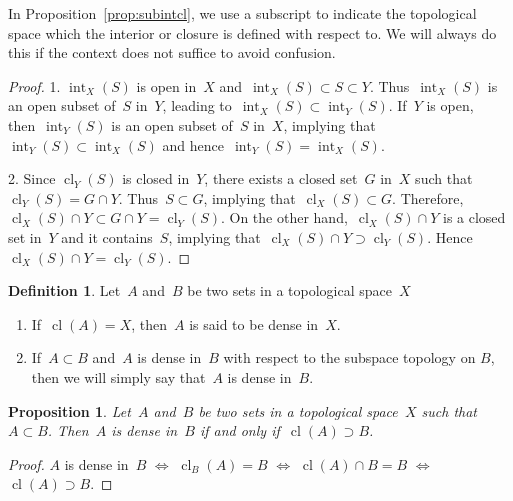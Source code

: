 \documentclass[11pt,a4paper]{article}  %
\newtheorem{proposition}{Proposition}[section]
\theoremstyle{definition}
\newtheorem{definition}{Definition}[section]
\DeclareMathOperator{\inter}{int}
\DeclareMathOperator{\cl}{cl}
\numberwithin{equation}{section}
\begin{document}
In Proposition~\ref{prop:subintcl}, we use a subscript to indicate the topological space which the
interior or closure is defined with respect to. We will always do this if the context does not
suffice to avoid confusion.

\begin{proof}
  1. $\inter_X(S)$ is open in~$X$ and~$\inter_X(S)\subset S\subset Y$. Thus~$\inter_X(S)$ is an open
     subset of~$S$ in~$Y$, leading to~$\inter_X(S)\subset \inter_Y(S)$. If~$Y$ is open,
     then~$\inter_Y(S)$ is an open subset of~$S$ in~$X$, implying that~$\inter_Y(S)\subset
     \inter_X(S)$ and hence~$\inter_Y(S) = \inter_X(S)$.

  2. %
     Since $\cl_Y(S)$ is closed in~$Y$, there exists a closed set~$G$ in~$X$ such
     that~$\cl_Y(S)= G\cap Y$. Thus~$S\subset  G$, implying that~$\cl_X(S) \subset G$.
     Therefore,~$\cl_X(S)\cap Y \subset G\cap Y = \cl_Y(S)$.  On the other hand,~$\cl_X(S)\cap Y$ is
     a closed set in~$Y$ and it contains~$S$, implying that~$\cl_X(S)\cap Y \supset \cl_Y(S)$.
     Hence~$\cl_X(S)\cap Y = \cl_Y(S)$.
\end{proof}

\begin{definition}
  \label{def:dense}
  Let~$A$ and~$B$ be two sets in a topological space~$X$
  \begin{enumerate}
    \item If~$\cl(A) = X$, then~$A$ is said to be dense in~$X$.
    \item If~$A\subset B$ and~$A$ is dense in~$B$ with respect to the subspace topology on $B$,
    then we will simply say that~$A$ is dense in~$B$.
  \end{enumerate}
\end{definition}

\begin{proposition}
  \label{prop:densein}
  Let~$A$ and~$B$ be two sets in a topological space~$X$ such that~$A\subset B$. Then~$A$ is dense
  in~$B$ if and only if~$\cl(A) \supset B$.
\end{proposition}

\begin{proof}
  $A$ is dense in~$B$ $\Leftrightarrow $ $\cl_B(A) = B$ $\Leftrightarrow$ $\cl(A)\cap B = B$
  $\Leftrightarrow$ $\cl(A) \supset B$.
\end{proof}
\end{document}
